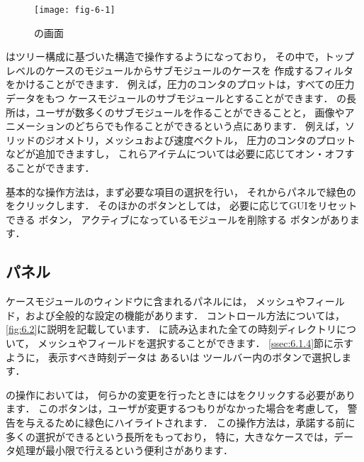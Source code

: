 \begin{figure}[ht]
 \texttt{[image: fig-6-1]}
 \caption{の画面}
 \label{fig:6.1}
\end{figure}


はツリー構成に基づいた構造で操作するようになっており，
その中で，トップレベルのケースのモジュールからサブモジュールのケースを
作成するフィルタをかけることができます．
例えば，圧力のコンタのプロットは，すべての圧力データをもつ
ケースモジュールのサブモジュールとすることができます．
の長所は，ユーザが数多くのサブモジュールを作ることができることと，
画像やアニメーションのどちらでも作ることができるという点にあります．
例えば，ソリッドのジオメトリ，メッシュおよび速度ベクトル，
圧力のコンタのプロットなどが追加できますし，
これらアイテムについては必要に応じてオン・オフすることができます．

基本的な操作方法は，まず必要な項目の選択を行い，
それからパネルで緑色の
%
%
をクリックします．
そのほかのボタンとしては，
必要に応じてGUIをリセットできる
%
%
ボタン，
アクティブになっているモジュールを削除する
%
%
ボタンがあります．


\subsection{パネル}
\label{ssec:6.1.2}
ケースモジュールのウィンドウに含まれるパネルには，
メッシュやフィールド，および全般的な設定の機能があります．
コントロール方法については，\autoref{fig:6.2}に説明を記載しています．
に読み込まれた全ての時刻ディレクトリについて，
メッシュやフィールドを選択することができます．
\autoref{ssec:6.1.4}節に示すように，
表示すべき時刻データは
%
%
あるいは
%
%
ツールバー内のボタンで選択します．

の操作においては，
何らかの変更を行ったときにはをクリックする必要があります．
このボタンは，ユーザが変更するつもりがなかった場合を考慮して，
警告を与えるために緑色にハイライトされます．
この操作方法は，承諾する前に多くの選択ができるという長所をもっており，
特に，大きなケースでは，データ処理が最小限で行えるという便利さがあります．

